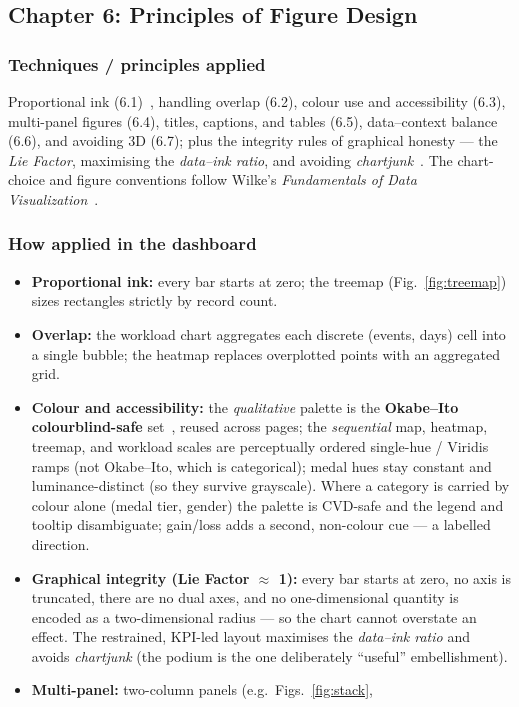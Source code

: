 \documentclass[11pt]{article}
\newcommand{\applied}{\subsubsection*{\color{teal}Techniques / principles applied}}
\newcommand{\howapplied}{\subsubsection*{\color{ocean}How applied in the dashboard}}
\begin{document}
\subsection{Chapter 6: Principles of Figure Design}
\applied
\begin{techbox}
Proportional ink (6.1)~\cite{bergstrom2016}, handling overlap (6.2), colour use and
accessibility (6.3), multi-panel figures (6.4), titles, captions, and tables (6.5),
data--context balance (6.6), and avoiding 3D (6.7); plus the integrity rules of
graphical honesty ---
the \emph{Lie Factor}, maximising the \emph{data--ink ratio}, and avoiding
\emph{chartjunk}~\cite{tufte2001}. The chart-choice and figure conventions follow
Wilke's \emph{Fundamentals of Data Visualization}~\cite{wilke2019}.
\end{techbox}
\howapplied
\begin{itemize}
  \item \textbf{Proportional ink:} every bar starts at zero; the treemap
        (Fig.~\ref{fig:treemap}) sizes rectangles strictly by record count.
  \item \textbf{Overlap:} the workload chart aggregates each discrete (events,
        days) cell into a single bubble; the heatmap replaces overplotted points
        with an aggregated grid.
  \item \textbf{Colour and accessibility:} the \emph{qualitative} palette is the
        \textbf{Okabe--Ito colourblind-safe} set~\cite{okabeito2008}, reused across pages; the
        \emph{sequential} map, heatmap, treemap, and workload scales are perceptually
        ordered single-hue / Viridis ramps (not Okabe--Ito, which is categorical);
        medal hues stay constant and luminance-distinct (so they survive grayscale).
        Where a category is carried by colour alone (medal tier, gender) the
        palette is CVD-safe and the legend and tooltip disambiguate; gain/loss
        adds a second, non-colour cue --- a labelled direction.
  \item \textbf{Graphical integrity (Lie Factor $\approx$ 1):} every bar starts at
        zero, no axis is truncated, there are no dual axes, and no one-dimensional
        quantity is encoded as a two-dimensional radius --- so the chart cannot
        overstate an effect. The restrained, KPI-led layout maximises the
        \emph{data--ink ratio} and avoids \emph{chartjunk} (the podium is the one
        deliberately ``useful'' embellishment).
  \item \textbf{Multi-panel:} two-column panels (e.g.\ Figs.~\ref{fig:stack},

\end{itemize}
\end{document}
